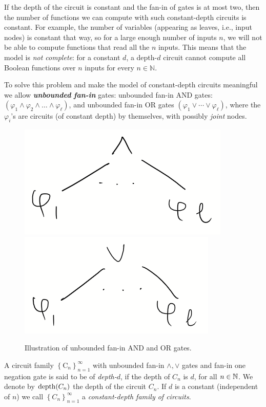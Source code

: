 

If the depth of the circuit is constant and the fan-in of gates is at most two, then the number of functions we can compute with such constant-depth circuits is constant. For example, the number of variables (appearing as leaves, i.e., input nodes) is constant that way, so for a large enough number of inputs $n$, we will not be able to compute functions that read all the $n$ inputs. This means that the model is \emph{not  complete}: for a constant $d$, a depth-$d$ circuit cannot compute all Boolean functions over $n$ inputs for every $n \in \mathbb{N}$.

To solve this problem and make the model of constant-depth
circuits meaningful we allow \textbf{\textit{unbounded} \emph{fan-in}} gates: unbounded fan-in AND gates: $\left(\varphi_1 \wedge \varphi_2 \wedge \ldots \wedge \varphi_\ell\right)$, and unbounded fan-in OR gates
$\left(\varphi_1\lor \cdots \lor \varphi_{\ell}\right)$, where the $\varphi_i$'s are circuits (of constant depth) by themselves, with possibly \emph{joint} nodes. 
\begin{figure}
    \centering
    \includegraphics[width=0.2\linewidth]{images/AND.png}
    \includegraphics[width=0.25\linewidth]{images/OR.png}
    \caption{Illustration of unbounded fan-in AND and OR gates.}
\end{figure}



\newcommand{\depth}{\ensuremath{{\rm depth}}}

\begin{definition}
\label{def:constant-depth-circuit}
A circuit family 
$\left\{\mathrm{C}_n\right\}_{n=1}^\infty$ with unbounded fan-in $\land,\lor$ gates and fan-in one negation gate is said to be of \emph{depth-$d$}, if the depth of $C_{n}$ is $d$, for all $n\in\mathbb{N}$. We denote by $\depth(C_n)$ the depth of the circuit $C_n$.
If $d$ is a constant (independent of $n$) we call $\left\{C_n\right\}_{n=1}^\infty$ a \emph{constant-depth family of circuits}.
\end{definition}


